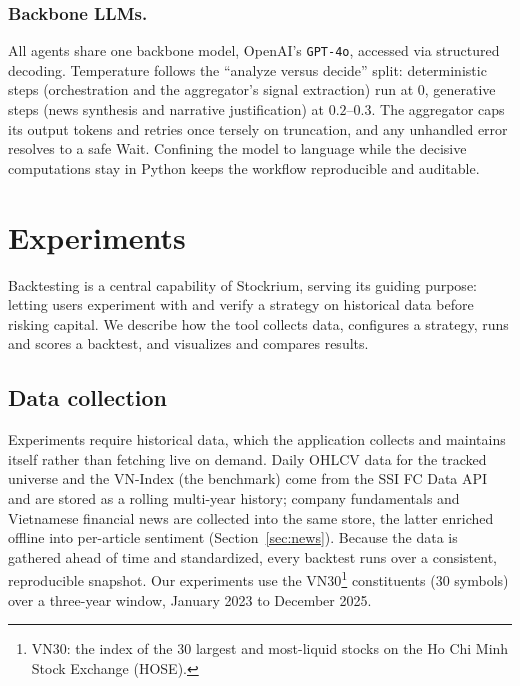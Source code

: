 \documentclass[runningheads]{llncs}
\begin{document}
\subsubsection{Backbone LLMs.}
All agents share one backbone model, OpenAI's \texttt{GPT-4o}, accessed via
structured decoding. Temperature follows the ``analyze versus decide'' split:
deterministic steps (orchestration and the aggregator's signal extraction) run at
$0$, generative steps (news synthesis and narrative justification) at
$0.2$--$0.3$. The aggregator caps its output tokens and retries once tersely on
truncation, and any unhandled error resolves to a safe \textsf{Wait}. Confining
the model to language while the decisive computations stay in Python keeps the
workflow reproducible and auditable.

\section{Experiments}
\label{sec:experiments}

Backtesting is a central capability of Stockrium, serving its guiding purpose:
letting users experiment with and verify a strategy on historical data before
risking capital. We describe how the tool collects data, configures a strategy,
runs and scores a backtest, and visualizes and compares results.

\subsection{Data collection}
Experiments require historical data, which the application collects and maintains
itself rather than fetching live on demand. Daily OHLCV data for the tracked
universe and the VN-Index (the benchmark) come from the SSI FC Data API and are
stored as a rolling multi-year history; company fundamentals and Vietnamese
financial news are collected into the same store, the latter enriched offline into
per-article sentiment (Section~\ref{sec:news}). Because the data is gathered ahead
of time and standardized, every backtest runs over a consistent, reproducible
snapshot. Our experiments use the VN30\footnote{VN30: the index of the $30$
largest and most-liquid stocks on the Ho Chi Minh Stock Exchange (HOSE).}
constituents ($30$ symbols) over a
three-year window, January 2023 to December 2025.
\end{document}
